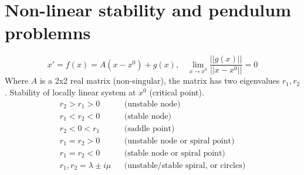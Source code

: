 \documentclass{article}
\theoremstyle{definition}
\begin{document}
\section*{Non-linear stability and pendulum problemns}
\[
    x' = f(x) = A(x - x^0) + g(x), \ \ \ \ \lim_{x \rightarrow x^0}\frac{||g(x)||}{||x - x^0||} = 0
\]
Where $A$ is a 2x2 real matrix (non-singular), the matrix has two eigenvalues $r_1, r_2$.
Stability of locally linear system at $x^0$ (critical point).
\begin{align*}
    r_2 > r_1 > 0 && \text{(unstable node)} \\
    r_1 < r_2 < 0 && \text{(stable node)} \\
    r_2 < 0 < r_1 && \text{(saddle point)} \\
    r_1 = r_2 > 0 && \text{(unstable node or spiral point)} \\
    r_1 = r_2 < 0 && \text{(stable node or spiral point)} \\
    r_1,r_2 = \lambda \pm i\mu && \text{(unstable/stable spiral, or circles)}
\end{align*}
\end{document}
